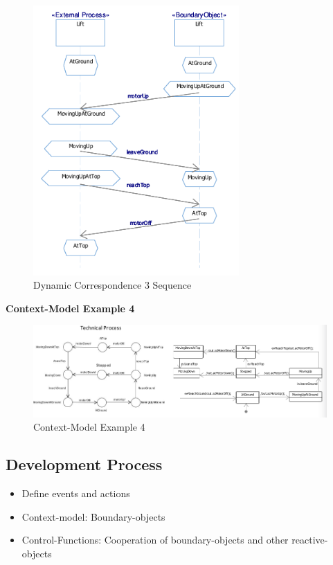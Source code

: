 \begin{figure}[H]
\centering
\includegraphics[width=0.7\textwidth]{figures/sequenceToDynamicCorrespondenceExample.png}
\caption{Dynamic Correspondence 3 Sequence}
\end{figure}

\clearpage
\textbf{Context-Model Example 4}
\begin{figure}[H]
\centering
\includegraphics[width=1\textwidth]{figures/dynamicCorrespondence4.png}
\caption{Context-Model Example 4}
\end{figure}

\hypertarget{development-process}{%
\subsection{Development Process}\label{development-process}}

\begin{itemize}
\tightlist
\item
  Define events and actions
\item
  Context-model: Boundary-objects
\item
  Control-Functions: Cooperation of boundary-objects and other
  reactive-objects
\end{itemize}

